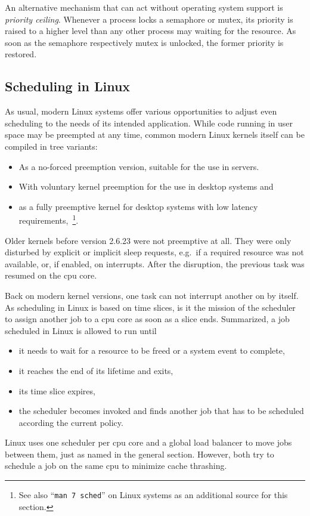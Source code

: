 An alternative mechanism that can act without operating system support is \textit{priority ceiling}.
Whenever a process locks a semaphore or mutex, its priority is raised to a higher level than any other process may waiting for the resource.
As soon as the semaphore respectively mutex is unlocked, the former priority is restored\cite{glatz2015betriebssysteme}.

 
\subsection{Scheduling in Linux}
As usual, modern Linux systems offer various opportunities to adjust even scheduling to the needs of its intended application.
While code running in user space may be preempted at any time, common modern Linux kernels itself can be compiled in tree variants:
\begin{itemize}
    \item As a no-forced preemption version, suitable for the use in servers.
    \item With voluntary kernel preemption for the use in desktop systems and
    \item as a fully preemptive kernel for desktop systems with low latency requirements\cite{lfd430},~\footnote{See also ``\texttt{man 7 sched}'' on Linux systems as an additional source for this section.}.
\end{itemize}
Older kernels before version 2.6.23 were not preemptive at all.
They were only disturbed by explicit or implicit sleep requests, e.g.\ if a required resource was not available, or, if enabled, on interrupts.
After the disruption, the previous task was resumed on the \ac{cpu} core.

Back on modern kernel versions, one task can not interrupt another on by itself.
As scheduling in Linux is based on time slices, is it the mission of the scheduler to assign another job to a \ac{cpu} core as soon as a slice ends.
Summarized, a job scheduled in Linux is allowed to run until
\begin{itemize}
    \item it needs to wait for a resource to be freed or a system event to complete,
    \item it reaches the end of its lifetime and exits,
    \item its time slice expires,
    \item the scheduler becomes invoked and finds another job that has to be scheduled according the current policy\cite{lfd430}.
\end{itemize}
Linux uses one scheduler per \ac{cpu} core and a global load balancer to move jobs between them, just as named in the general section.
However, both try to schedule a job on the same \ac{cpu} to minimize cache thrashing\cite{lfd430}.

